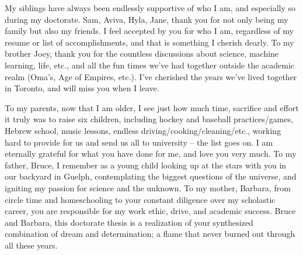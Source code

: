 \documentclass[letterpaper]{ut-thesis} %
\begin{document}
\begin{preliminary}
\begin{acknowledgements}
My siblings have always been endlessly supportive of who I am, and especially so during my doctorate.
Sam, Aviva, Hyla, Jane, thank you for not only being my family but also my friends.
I feel accepted by you for who I am, regardless of my resume or list of accomplishments, and that is something I cherish dearly.  
To my brother Joey, thank you for the countless discussions about science, machine learning, life, etc., and all the fun times we've had together outside the academic realm (Oma's, Age of Empires, etc.). 
I've cherished the years we've lived together in Toronto, and will miss you when I leave. 

To my parents, now that I am older, I see just how much time, sacrifice and effort it truly was to raise six children, including hockey and baseball practices/games, Hebrew school, music lessons, endless driving/cooking/cleaning/etc., working hard to provide for us and send us all to university -- the list goes on. 
I am eternally grateful for what you have done for me, and love you very much. 
To my father, Bruce, I remember as a young child looking up at the stars with you in our backyard in Guelph, contemplating the biggest questions of the universe, and igniting my passion for science and the unknown.
To my mother, Barbara, from circle time and homeschooling to your constant diligence over my scholastic career, you are responsible for my work ethic, drive, and academic success.
Bruce and Barbara, this doctorate thesis is a realization of your synthesized combination of dream and determination; a flame that never burned out through all these years. 

\end{acknowledgements}

\tableofcontents

\listoftables

\listoffigures

\end{preliminary}

\end{document}
